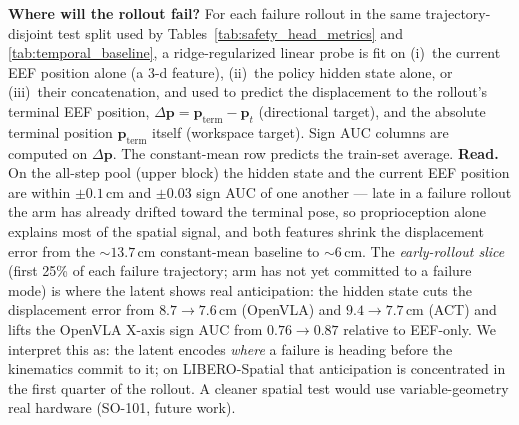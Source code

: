 \begin{table}[t]
\caption{\textbf{Where will the rollout fail?} For each failure rollout in the same trajectory-disjoint test split used by Tables~\ref{tab:safety_head_metrics} and \ref{tab:temporal_baseline}, a ridge-regularized linear probe is fit on (i)~the current EEF position alone (a 3-d feature), (ii)~the policy hidden state alone, or (iii)~their concatenation, and used to predict the displacement to the rollout's terminal EEF position, $\Delta\mathbf{p} = \mathbf{p}_{\mathrm{term}} - \mathbf{p}_t$ (directional target), and the absolute terminal position $\mathbf{p}_{\mathrm{term}}$ itself (workspace target). Sign AUC columns are computed on $\Delta\mathbf{p}$. The constant-mean row predicts the train-set average. \textbf{Read.} On the all-step pool (upper block) the hidden state and the current EEF position are within $\pm 0.1$\,cm and $\pm 0.03$ sign AUC of one another --- late in a failure rollout the arm has already drifted toward the terminal pose, so proprioception alone explains most of the spatial signal, and both features shrink the displacement error from the $\sim 13.7$\,cm constant-mean baseline to $\sim 6$\,cm. The \emph{early-rollout slice} (first 25\% of each failure trajectory; arm has not yet committed to a failure mode) is where the latent shows real anticipation: the hidden state cuts the displacement error from $8.7\to 7.6$\,cm (OpenVLA) and $9.4\to 7.7$\,cm (ACT) and lifts the OpenVLA X-axis sign AUC from $0.76\to 0.87$ relative to EEF-only. We interpret this as: the latent encodes \emph{where} a failure is heading before the kinematics commit to it; on LIBERO-Spatial that anticipation is concentrated in the first quarter of the rollout. A cleaner spatial test would use variable-geometry real hardware (SO-101, future work).}
\label{tab:spatial_failure}
\end{table}
